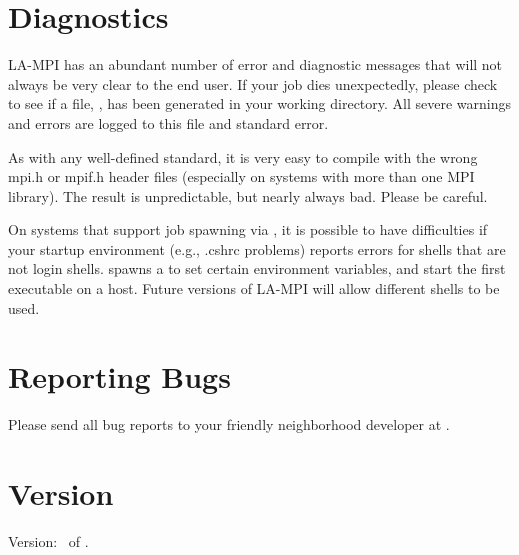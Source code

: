 \documentclass[english]{article}
\begin{document}
\section{Diagnostics}
LA-MPI has an abundant number of error and diagnostic messages that will not
always be very clear to the end user. If your job dies unexpectedly, please
check to see if a file, , has been generated in your working
directory.  All severe warnings and errors are logged to this file and standard
error.

As with any well-defined standard, it is very easy to compile with the wrong
mpi.h or mpif.h header files (especially on systems with more than one MPI
library). The result is unpredictable, but nearly always bad. Please be careful.

On systems that support job spawning via , it is possible to have
difficulties if your  startup environment (e.g., .cshrc problems)
reports errors for shells that are not login shells.  spawns a
 to set certain environment variables, and start the first executable
on a host. Future versions of LA-MPI will allow different shells to be used.

\section{Reporting Bugs}
Please send all bug reports to your friendly neighborhood developer at
.

\section{Version}
Version: \Version\ of \Date.
\end{document}
